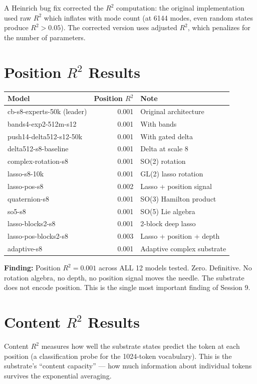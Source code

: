 \documentclass[11pt,a4paper]{report}
\newcommand{\finding}[1]{\textcolor{finding}{\textbf{Finding:}} #1}
\begin{document}
A Heinrich bug fix corrected the $R^2$ computation: the original implementation used raw $R^2$ which inflates with mode count (at 6144 modes, even random states produce $R^2 > 0.05$). The corrected version uses adjusted $R^2$, which penalizes for the number of parameters.

\section{Position $R^2$ Results}

\begin{center}
\begin{tabular}{lrl}
\toprule
Model & Position $R^2$ & Note \\
\midrule
cb-s8-experts-50k (leader) & 0.001 & Original architecture \\
bands4-exp2-512m-s12 & 0.001 & With bands \\
push14-delta512-s12-50k & 0.001 & With gated delta \\
delta512-s8-baseline & 0.001 & Delta at scale 8 \\
complex-rotation-s8 & 0.001 & SO(2) rotation \\
lasso-s8-10k & 0.001 & GL(2) lasso rotation \\
lasso-pos-s8 & 0.002 & Lasso + position signal \\
quaternion-s8 & 0.001 & SO(3) Hamilton product \\
so5-s8 & 0.001 & SO(5) Lie algebra \\
lasso-blocks2-s8 & 0.001 & 2-block deep lasso \\
lasso-pos-blocks2-s8 & 0.003 & Lasso + position + depth \\
adaptive-s8 & 0.001 & Adaptive complex substrate \\
\bottomrule
\end{tabular}
\end{center}

\finding{Position $R^2 = 0.001$ across ALL 12 models tested. Zero. Definitive.} No rotation algebra, no depth, no position signal moves the needle. The substrate does not encode position. This is the single most important finding of Session 9.

\section{Content $R^2$ Results}

Content $R^2$ measures how well the substrate states predict the token at each position (a classification probe for the 1024-token vocabulary). This is the substrate's ``content capacity'' --- how much information about individual tokens survives the exponential averaging.
\end{document}
